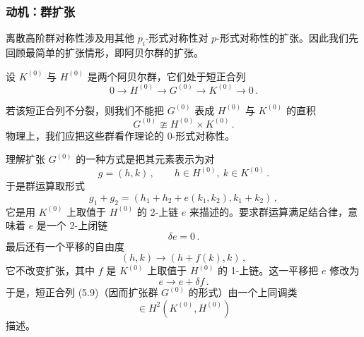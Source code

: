 \subsubsection{动机：群扩张}

离散高阶群对称性涉及用其他 $p_i$-形式对称性对 $p$-形式对称性的扩张。因此我们先回顾最简单的扩张情形，即阿贝尔群的扩张。

设 $K^{(0)}$ 与 $H^{(0)}$ 是两个阿贝尔群，它们处于短正合列
\begin{equation}
  0\to H^{(0)}\to G^{(0)}\to K^{(0)}\to 0\,. \tag{5.9}
\end{equation}

若该短正合列不分裂，则我们不能把 $G^{(0)}$ 表成 $H^{(0)}$ 与 $K^{(0)}$ 的直积
\begin{equation}
  G^{(0)}\ncong H^{(0)}\times K^{(0)}\,. \tag{5.10}
\end{equation}
物理上，我们应把这些群看作理论的 0-形式对称性。

理解扩张 $G^{(0)}$ 的一种方式是把其元素表示为对
\begin{equation}
  g=(h,k)\,,\qquad h\in H^{(0)},\ k\in K^{(0)}\,. \tag{5.11}
\end{equation}
于是群运算取形式
\begin{equation}
  g_1+g_2=(h_1+h_2+e(k_1,k_2),k_1+k_2)\,, \tag{5.12}
\end{equation}
它是用 $K^{(0)}$ 上取值于 $H^{(0)}$ 的 2-上链 $e$ 来描述的。要求群运算满足结合律，意味着 $e$ 是一个 2-上闭链
\begin{equation}
  \delta e=0\,. \tag{5.13}
\end{equation}
最后还有一个平移的自由度
\begin{equation}
  (h,k)\to(h+f(k),k)\,, \tag{5.14}
\end{equation}
它不改变扩张，其中 $f$ 是 $K^{(0)}$ 上取值于 $H^{(0)}$ 的 1-上链。这一平移把 $e$ 修改为
\begin{equation}
  e\to e+\delta f\,. \tag{5.15}
\end{equation}
于是，短正合列 (5.9)（因而扩张群 $G^{(0)}$ 的形式）由一个上同调类
\begin{equation}
  [e]\in H^2(K^{(0)},H^{(0)}) \tag{5.16}
\end{equation}
描述。


